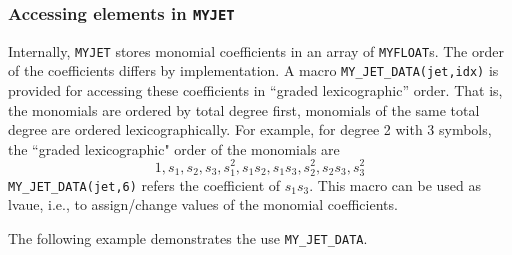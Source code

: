 \documentclass[10pt]{article}
\theoremstyle{remark}
\newcommand{\myfloat}{{\tt MY\symbol{95}FLOAT}}
\newcommand{\myjet}{{\tt MY\symbol{95}JET}}
\newcommand{\inputfiles}[1]{%
\ifthenelse{\equal{#1}{sec:ex0}}{{\tt lorenz1.eq}}{%
\ifthenelse{\equal{#1}{sec:ex1}}{{\tt lorenz1.eq}}{%
\ifthenelse{\equal{#1}{sec:ex_params}}{{\tt perturbation.eq}}{%
\ifthenelse{\equal{#1}{sec:ex_lyap}}{{\tt lorenz2.eq}}{%
\ifthenelse{\equal{#1}{sec:ex_varieq}}{{\tt lorenz3.eq}}{%
\ifthenelse{\equal{#1}{sec:ex5}}{{\tt lorenz4.eq}}{%
\ifthenelse{\equal{#1}{sec:ex_omp}}{{\tt lorenz4.eq}}{%
\ifthenelse{\equal{#1}{sec:ex_equilibria}}{{\tt lorenz5.eq}}{%
\ifthenelse{\equal{#1}{sec:ex_myjetaccess}}{{\tt model.eq}}{%
\ifthenelse{\equal{#1}{sec:ex_driving}}{{\tt lorenz1.eq}}{%
\ifthenelse{\equal{#1}{sec:ex_io_myjet}}{{\tt io\symbol{95}myjet.eq}}{%
\ifthenelse{\equal{#1}{sec:ex_uniform}}{{\tt vdp.eq}}{%
ERROR!!!!!}}}}}}}}}}}}%
}
\newcommand{\odecfiles}[1]{%
\ifthenelse{\equal{#1}{sec:ex0}}{{\tt lorenz1.c}}{%
\ifthenelse{\equal{#1}{sec:ex1}}{{\tt lorenz1.c}}{%
\ifthenelse{\equal{#1}{sec:ex_params}}{{\tt perturbation.c}}{%
\ifthenelse{\equal{#1}{sec:ex_lyap}}{{\tt lorenz2.c}}{%
\ifthenelse{\equal{#1}{sec:ex_varieq}}{{\tt lorenz3.c}}{%
\ifthenelse{\equal{#1}{sec:ex5}}{{\tt lorenz4.c}}{%
\ifthenelse{\equal{#1}{sec:ex_omp}}{{\tt lorenz4.c}}{%
\ifthenelse{\equal{#1}{sec:ex_equilibria}}{{\tt lorenz5.c}}{%
\ifthenelse{\equal{#1}{sec:ex_myjetaccess}}{{\tt jdata.c}}{%
\ifthenelse{\equal{#1}{sec:ex_driving}}{{\tt lorenz.c}}{%
\ifthenelse{\equal{#1}{sec:ex_io_myjet}}{{\tt io\symbol{95}myjet.c}}{%
\ifthenelse{\equal{#1}{sec:ex_uniform}}{{\tt vdp.c}}{%
ERROR!!!!!}}}}}}}}}}}}%
}
\newcommand{\odehfiles}[1]{%
\ifthenelse{\equal{#1}{sec:ex0}}{{\tt taylor.h}}{%
\ifthenelse{\equal{#1}{sec:ex1}}{{\tt taylor.h}}{%
\ifthenelse{\equal{#1}{sec:ex_params}}{{\tt taylor.h}}{%
\ifthenelse{\equal{#1}{sec:ex_lyap}}{{\tt lorenz2.h}}{%
\ifthenelse{\equal{#1}{sec:ex_varieq}}{{\tt lorenz3.h}}{%
\ifthenelse{\equal{#1}{sec:ex5}}{{\tt lorenz4.h}}{%
\ifthenelse{\equal{#1}{sec:ex_omp}}{{\tt lorenz4.h}}{%
\ifthenelse{\equal{#1}{sec:ex_equilibria}}{{\tt lorenz5.h}}{%
\ifthenelse{\equal{#1}{sec:ex_myjetaccess}}{{\tt jdata.h}}{%
\ifthenelse{\equal{#1}{sec:ex_driving}}{{\tt taylor.h}}{%
\ifthenelse{\equal{#1}{sec:ex_io_myjet}}{{\tt io\symbol{95}myjet.h}}{%
\ifthenelse{\equal{#1}{sec:ex_uniform}}{{\tt vdp.h}}{%
ERROR!!!!!}}}}}}}}}}}}%
}
\newcommand{\mainfiles}[1]{%
\ifthenelse{\equal{#1}{sec:ex0}}{{\tt main\symbol{95}lrnz.c}}{%
\ifthenelse{\equal{#1}{sec:ex1}}{{\tt main\symbol{95}lrnz.c}}{%
\ifthenelse{\equal{#1}{sec:ex_params}}{{\tt main\symbol{95}params.c}}{%
\ifthenelse{\equal{#1}{sec:ex_lyap}}{{\tt main\symbol{95}lyap.c}}{%
\ifthenelse{\equal{#1}{sec:ex_varieq}}{{\tt main\symbol{95}varieq.c}}{%
\ifthenelse{\equal{#1}{sec:ex5}}{{\tt main4.c}}{%
\ifthenelse{\equal{#1}{sec:ex_omp}}{{\tt main\symbol{95}omp.c}}{%
\ifthenelse{\equal{#1}{sec:ex_equilibria}}{{\tt main\symbol{95}equilibria.c}}{%
\ifthenelse{\equal{#1}{sec:ex_myjetaccess}}{{\tt jdata\symbol{95}main.c}}{%
\ifthenelse{\equal{#1}{sec:ex_io_myjet}}{{\tt io\symbol{95}main.c}}{%
\ifthenelse{\equal{#1}{sec:ex_uniform}}{{\tt main\symbol{95}vdp.c}}{%
ERROR!!!!!}}}}}}}}}}}%
}
\newcommand{\inputfile}{}
\newcommand{\mainfile}{}
\newcommand{\odecfile}{}
\newcommand{\odehfile}{}
\begin{document}
\subsubsection*{Accessing elements in \myjet{}} \label{sec:ex_myjetaccess}
\renewcommand{\inputfile}{\inputfiles{sec:ex_myjetaccess}}
\renewcommand{\odecfile}{\odecfiles{sec:ex_myjetaccess}}
\renewcommand{\odehfile}{\odehfiles{sec:ex_myjetaccess}}
\renewcommand{\mainfile}{\mainfiles{sec:ex_myjetaccess}}

Internally, \myjet{} stores monomial coefficients in an array of
\myfloat{}s. The order of the coefficients differs by
implementation. A macro \verb+MY_JET_DATA(jet,idx)+ is provided for
accessing these coefficients in ``graded lexicographic'' order.  That
is, the monomials are ordered by total degree first, monomials of the
same total degree are ordered lexicographically.  For example, for
degree 2 with 3 symbols, the ``graded lexicographic" order of the
monomials are
\[
1, s_1, s_2, s_3, s_1^2, s_1s_2, s_1s_3, s_2^2, s_2s_3, s_3^2
\]
\verb+MY_JET_DATA(jet,6)+ refers the coefficient of $s_1s_3$.  This
macro can be used as lvaue, i.e., to assign/change values of the
monomial coefficients.

\vspace{4mm}

The following example demonstrates the use \verb+MY_JET_DATA+.
\end{document}
